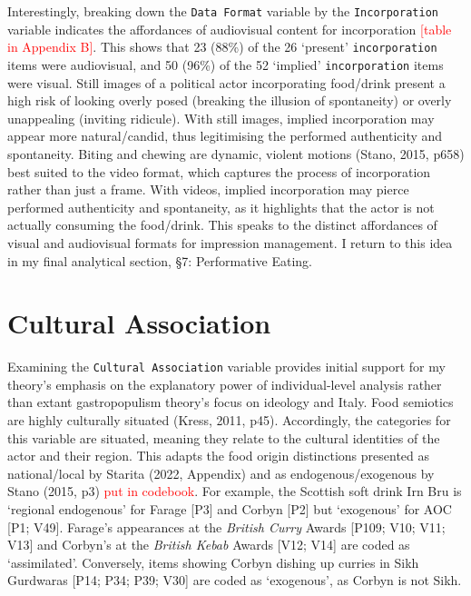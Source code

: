 \documentclass[a4paper, nobind]{templates/ociamthesis}
\begin{document}
Interestingly, breaking down the \texttt{Data\ Format} variable by the \texttt{Incorporation} variable indicates the affordances of audiovisual content for incorporation \textcolor{red}{{[}table in Appendix B{]}}. This shows that 23 (88\%) of the 26 `present' \texttt{incorporation} items were audiovisual, and 50 (96\%) of the 52 `implied' \texttt{incorporation} items were visual. Still images of a political actor incorporating food/drink present a high risk of looking overly posed (breaking the illusion of spontaneity) or overly unappealing (inviting ridicule). With still images, implied incorporation may appear more natural/candid, thus legitimising the performed authenticity and spontaneity. Biting and chewing are dynamic, violent motions (Stano, 2015, p658) best suited to the video format, which captures the process of incorporation rather than just a frame. With videos, implied incorporation may pierce performed authenticity and spontaneity, as it highlights that the actor is not actually consuming the food/drink. This speaks to the distinct affordances of visual and audiovisual formats for impression management.
I return to this idea in my final analytical section, §7: Performative Eating.

\hypertarget{cultural-association}{%
\section*{Cultural Association}\label{cultural-association}}

Examining the \texttt{Cultural\ Association} variable provides initial support for my theory's emphasis on the explanatory power of individual-level analysis rather than extant gastropopulism theory's focus on ideology and Italy.
Food semiotics are highly culturally situated (Kress, 2011, p45). Accordingly, the categories for this variable are situated, meaning they relate to the cultural identities of the actor and their region. This adapts the food origin distinctions presented as national/local by Starita (2022, Appendix) and as endogenous/exogenous by Stano (2015, p3) \textcolor{red}{put in codebook}. For example, the Scottish soft drink Irn Bru is `regional endogenous' for Farage {[}P3{]} and Corbyn {[}P2{]} but `exogenous' for AOC {[}P1; V49{]}. Farage's appearances at the \emph{British Curry} Awards {[}P109; V10; V11; V13{]} and Corbyn's at the \emph{British Kebab} Awards {[}V12; V14{]} are coded as `assimilated'. Conversely, items showing Corbyn dishing up curries in Sikh Gurdwaras {[}P14; P34; P39; V30{]} are coded as `exogenous', as Corbyn is not Sikh.
\end{document}
